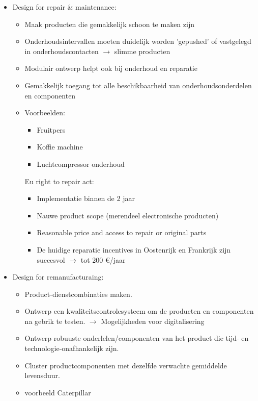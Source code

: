 \documentclass[12pt]{article}
\begin{document}
\begin{itemize}
\begin{itemize}
\begin{itemize}
        \end{itemize}
    \end{itemize}
    \item Design for repair \& maintenance:\begin{itemize}
        \item Maak producten die gemakkelijk schoon te maken zijn 
        \item Onderhoudsintervallen moeten duidelijk worden 'gepushed' of vastgelegd in onderhoudscontacten $\rightarrow$ slimme producten 
        \item Modulair ontwerp helpt ook bij onderhoud en reparatie 
        \item Gemakkelijk toegang tot alle beschikbaarheid van onderhoudsonderdelen en componenten 
        \item Voorbeelden:\begin{itemize}
            \item Fruitpers 
            \item Koffie machine 
            \item Luchtcompressor onderhoud
        \end{itemize}
        Eu right to repair act:\begin{itemize}
            \item Implementatie binnen de 2 jaar 
            \item Nauwe product scope (merendeel electronische producten) 
            \item Reasonable price and access to repair or original parts
            \item[] De huidige reparatie incentives in Oostenrijk en Frankrijk zijn succesvol $\rightarrow$ tot 200 €/jaar
        \end{itemize}
    \end{itemize}
    \item Design for remanufacturaing:\begin{itemize}
        \item Product-dienstcombinaties maken.
        \item Ontwerp een kwaliteitscontrolesysteem om de producten en componenten na gebrik te testen. $\rightarrow$ Mogelijkheden voor digitalisering 
        \item Ontwerp robuuste onderlelen/componenten van het product die tijd- en technologie-onafhankelijk zijn.
        \item Cluster productcomponenten met dezelfde verwachte gemiddelde levensduur. 
        \item voorbeeld Caterpillar

\end{itemize}
\end{itemize}
\end{document}
